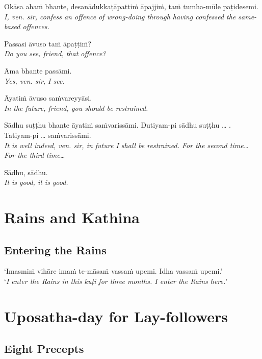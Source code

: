 \hangindent=25pt%
\parbox{22pt}{} Okāsa ahaṁ bhante, desanādukkaṭāpattiṁ āpajjiṁ, taṁ tumha-mūle paṭidesemi.\\ \emph{I, ven. sir, confess an offence of wrong-doing through having confessed the same-based offences.}

\hangindent=25pt%
\parbox{22pt}{} Passasi āvuso taṁ āpaṭṭiṁ?\\ \emph{Do you see, friend, that offence?}

\clearpage

\hangindent=25pt%
\parbox{22pt}{} Āma bhante passāmi.\\ \emph{Yes, ven. sir, I see.}

\hangindent=25pt%
\parbox{22pt}{} Āyatiṁ āvuso saṁvareyyāsi.\\ \emph{In the future, friend, you should be restrained.}

\hangindent=25pt%
\parbox{22pt}{} Sādhu suṭṭhu bhante āyatiṁ saṁvarissāmi. Dutiyam-pi sādhu suṭṭhu … . Tatiyam-pi … saṁvarissāmi.\\ \emph{It is well indeed, ven. sir, in future I shall be restrained. For the second time… For the third time…}

\hangindent=25pt%
\parbox{22pt}{} Sādhu, sādhu.\\ \emph{It is good, it is good.} 

\section{Rains and Kathina}

\subsection{Entering the Rains}

‘Imasmiṁ vihāre imaṁ te-māsaṁ vassaṁ upemi. Idha vassaṁ upemi.’\\
‘\emph{I enter the Rains in this kuṭi for three months. I enter the Rains
  here.}’

\section{Uposatha-day for Lay-followers}

\subsection{Eight Precepts}

